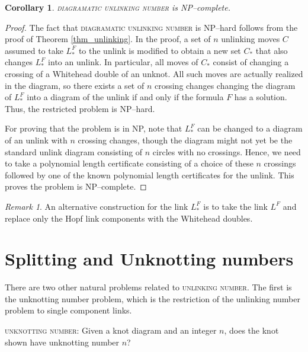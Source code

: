 \documentclass[12pt]{amsart}
\newtheorem{corr}[thm]{Corollary}
\theoremstyle{definition}
\theoremstyle{remark}
\newtheorem{rem}[thm]{Remark}
\begin{document}
\begin{corr}
\textsc{diagramatic unlinking number} is NP--complete.
\end{corr}
\begin{proof}
The fact that \textsc{diagramatic unlinking number} is NP--hard follows from the proof of Theorem \ref{thm_unlinking}.
In the proof, a set of $n$ unlinking moves $C$ assumed to take $L_*^F$ to the unlink is modified to obtain a new set $C_*$ that also changes $L_*^F$ into an unlink.
In particular, all moves of $C_*$ consist of changing a crossing of a Whitehead double of an unknot.
All such moves are actually realized in the diagram, so there exists a set of $n$ crossing changes changing the diagram of $L_*^F$ into a diagram of the unlink if and only if the formula $F$ has a solution.
Thus, the restricted problem is NP--hard.

For proving that the problem is in NP, note that $L_*^F$ can be changed to a diagram of an unlink with $n$ crossing changes, though the diagram might not yet be the standard unlink diagram consisting of $n$ circles with no crossings.
Hence, we need to take a polynomial length certificate consisting of a choice of these $n$ crossings followed by one of the known polynomial length certificates for the unlink.
This proves the problem is NP--complete.
\end{proof}

\begin{rem}
  An alternative construction for the link $L^F_*$ is to take the link $L^F$ and replace only the Hopf link components with the Whitehead doubles.


\end{rem}

\section{Splitting and Unknotting numbers}
\label{sec_splittingnum}

There are two other natural problems related to \textsc{unlinking number}.
The first is the unknotting number problem, which is the restriction of the unlinking number problem to single component links.


\vspace{0.14in}
\textsc{unknotting number}: Given a knot diagram and an integer $n$, does the knot shown have unknotting number $n$?
\vspace{0.14in}
\end{document}
